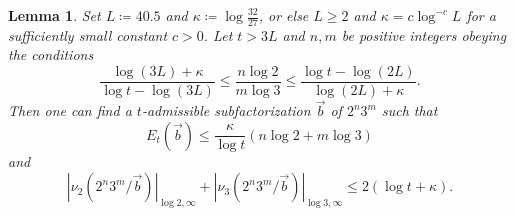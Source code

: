 \documentclass[12pt,a4paper,reqno]{amsart}
\numberwithin{equation}{section}
\theoremstyle{plain}
\newtheorem{lemma}[theorem]{Lemma}
\theoremstyle{definition}
\begin{document}
\begin{lemma}  Set $L \coloneqq 40.5$ and $\kappa \coloneqq \log \frac{32}{27}$, or else $L \geq 2$ and $\kappa = c \log^{-c} L$ for a sufficiently small constant $c>0$.  Let $t > 3L$ and $n,m$ be positive integers obeying the conditions
\begin{equation}\label{B-bound}
\frac{\log(3L)+\kappa}{\log t - \log(3L)} \leq \frac{n \log 2}{m \log 3} \leq \frac{\log t - \log(2L)}{\log(2L)+\kappa}.
\end{equation}
Then one can find a $t$-admissible subfactorization $\vec b$ of $2^n 3^m$ such that
\begin{equation}\label{excess-bound} 
  E_t(\vec b) \leq \frac{\kappa}{\log t} (n \log 2 + m \log 3)
\end{equation}
and
\begin{equation}\label{surplus-bound} 
  |\nu_2(2^n 3^m/\vec b)|_{\log 2,\infty} + |\nu_3(2^n 3^m/\vec b)|_{\log 3,\infty}  \leq 2(\log t + \kappa).
\end{equation}
\end{lemma}
\end{document}
